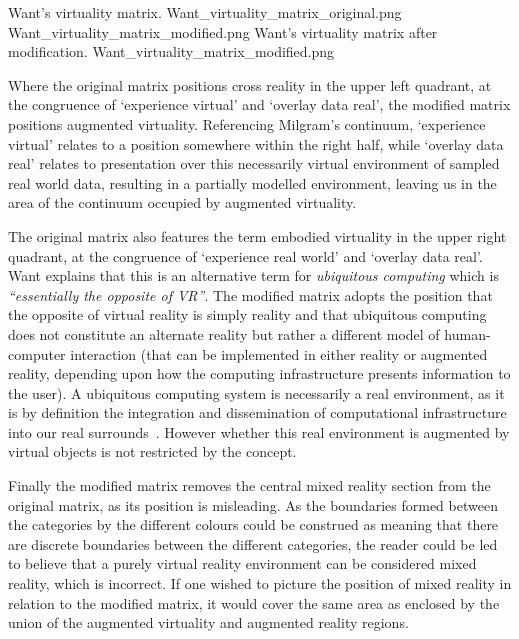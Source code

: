  {Want's virtuality matrix.} {Want_virtuality_matrix_original.png}
       {Want_virtuality_matrix_modified.png} {Want's virtuality matrix after modification.} {Want_virtuality_matrix_modified.png}

Where the original matrix positions cross reality in the upper left quadrant, at the congruence of `experience virtual' and `overlay data real', the modified matrix positions augmented virtuality. Referencing Milgram's continuum, `experience virtual' relates to a position somewhere within the right half, while `overlay data real' relates to presentation over this necessarily virtual environment of sampled real world data, resulting in a partially modelled environment, leaving us in the area of the continuum occupied by augmented virtuality.

The original matrix also features the term embodied virtuality in the upper right quadrant, at the congruence of `experience real world' and `overlay data real'. Want explains that this is an alternative term for \textit{ubiquitous computing} which is \textit{``essentially the opposite of VR''}. The modified matrix adopts the position that the opposite of virtual reality is simply reality and that ubiquitous computing does not constitute an alternate reality but rather a different model of human-computer interaction (that can be implemented in either reality or augmented reality, depending upon how the computing infrastructure presents information to the user). A ubiquitous computing system is necessarily a real environment, as it is by definition the integration and dissemination of computational infrastructure into our real surrounds~\cite{York2004}. However whether this real environment is augmented by virtual objects is not restricted by the concept.

Finally the modified matrix removes the central mixed reality section from the original matrix, as its position is misleading. As the boundaries formed between the categories by the different colours could be construed as meaning that there are discrete boundaries between the different categories, the reader could be led to believe that a purely virtual reality environment can be considered mixed reality, which is incorrect. If one wished to picture the position of mixed reality in relation to the modified matrix, it would cover the same area as enclosed by the union of the augmented virtuality and augmented reality regions.


